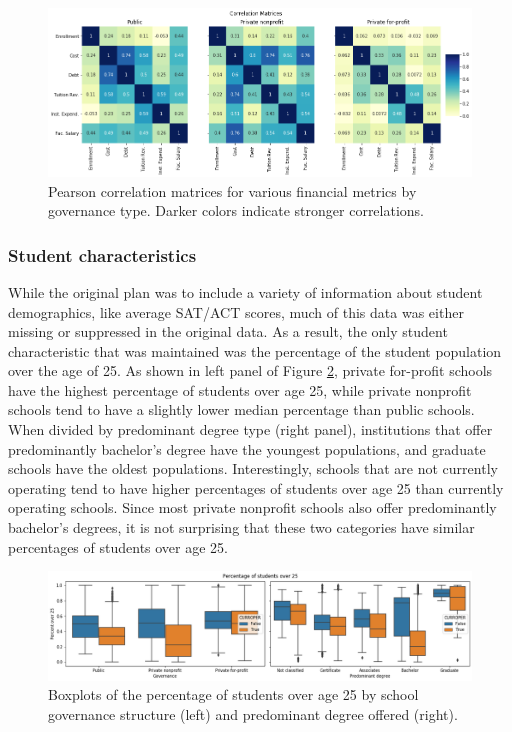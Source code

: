 \documentclass[11pt, letterpaper]{article}
\begin{document}
\begin{figure}[h]
\begin{center}
\includegraphics[width=6.5in]{currentFinanceCorrelationHeatmap.png}
\caption{Pearson correlation matrices for various financial metrics by governance type. Darker colors indicate stronger correlations.} 
\label{fig:Correlation}
\end{center}
\end{figure}

\subsubsection{Student characteristics}
While the original plan was to include a variety of information about student demographics, like average SAT/ACT scores, much of this data was either missing or suppressed in the original data. As a result, the only student characteristic that was maintained was the percentage of the student population over the age of 25. As shown in left panel of Figure \ref{fig:Age}, private for-profit schools have the highest percentage of students over age 25, while private nonprofit schools tend to have a slightly lower median percentage than public schools. When divided by predominant degree type (right panel), institutions that offer predominantly bachelor's degree have the youngest populations, and graduate schools have the oldest populations. Interestingly, schools that are not currently operating tend to have higher percentages of students over age 25 than currently operating schools. Since most private nonprofit schools also offer predominantly bachelor's degrees, it is not surprising that these two categories have similar percentages of students over age 25.

\begin{figure}[h]
\begin{center}
\includegraphics[width=6.5in]{currentOver25Boxes.png}
\caption{Boxplots of the percentage of students over age 25 by school governance structure (left) and predominant degree offered (right).} 
\label{fig:Age}
\end{center}
\end{figure}
\end{document}
